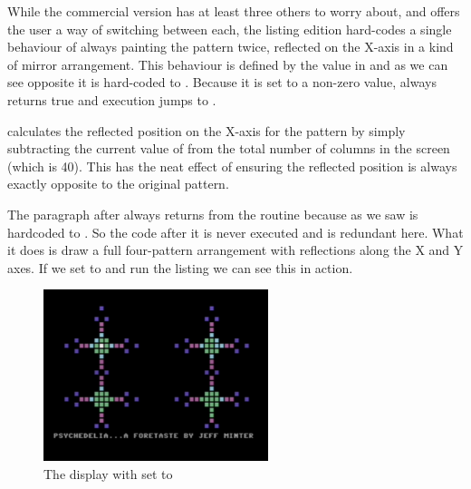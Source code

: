 While the commercial version has at least three others to worry about, and offers the user a way of switching between each,
the listing edition hard-codes a single behaviour of always painting the pattern twice, reflected on the X-axis in a kind of mirror
arrangement. This behaviour is defined by the value in  and as we can see opposite it
is hard-coded to . Because it is set to a non-zero value,  always returns true and execution
jumps to .

 calculates the reflected position on the X-axis for the pattern by simply subtracting the current value
of  from the total number of columns in the screen (which is 40). This has the neat effect of ensuring
the reflected position is always exactly opposite to the original pattern.

The paragraph after  always returns from the routine because as we saw  is
hardcoded to . So the code after it is never executed and is redundant here. What it does is draw a full four-pattern
arrangement with reflections along the X and Y axes. If we set  to  and run the
listing we can see this in action.


\begin{figure}[H]
    \centering
      \includegraphics[height=5cm]{src/listing_commentary/four_pattern.png}
  \caption*{The display with  set to }
\end{figure}


